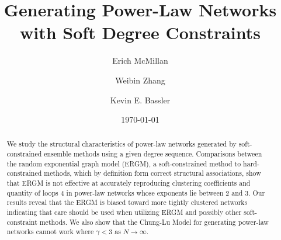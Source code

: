 \documentclass[aip,graphicx,amsmath]{revtex4-1}
\begin{document}

\title{Generating Power-Law Networks with Soft Degree Constraints} %

\author{Erich McMillan}
\author{Weibin Zhang}
\author{Kevin E. Bassler}


\date{\today}

\begin{abstract}
	We study the structural characteristics of power-law networks generated by soft-constrained ensemble methods using a given degree sequence. Comparisons between the random exponential graph model (ERGM), a soft-constrained method to hard-constrained methods, which by definition form correct structural associations, show that ERGM is not effective at accurately reproducing clustering coefficients and quantity of loops 4 in power-law networks whose exponents lie between 2 and 3. Our results reveal that the ERGM is biased toward more tightly clustered networks indicating that care should be used when utilizing ERGM and possibly other soft-constraint methods. We also show that the Chung-Lu Model for generating power-law networks cannot work where $\gamma<3$ as $N\to \infty$.
\end{abstract}

\pacs{}%

\maketitle %
\end{document}
